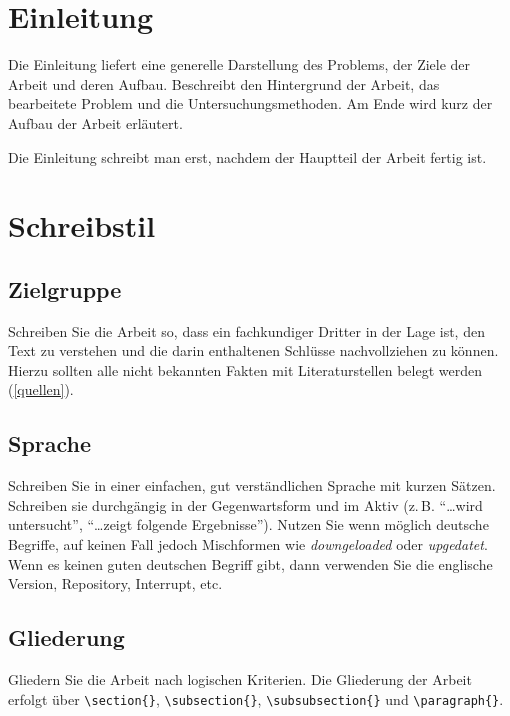 \documentclass[conference,compsoc,final,a4paper]{IEEEtran}
\begin{document}
\section{Einleitung}
Die Einleitung liefert eine generelle Darstellung des Problems, der Ziele der Arbeit und deren Aufbau. Beschreibt den Hintergrund der Arbeit, das bearbeitete Problem und die Untersuchungsmethoden. Am Ende wird kurz der Aufbau der Arbeit erläutert.

Die Einleitung schreibt man erst, nachdem der Hauptteil der Arbeit fertig ist.

\section{Schreibstil}
\subsection{Zielgruppe}
Schreiben Sie die Arbeit so, dass ein fachkundiger Dritter in der Lage ist, den Text zu verstehen und die darin enthaltenen Schlüsse nachvollziehen zu können. Hierzu sollten alle nicht bekannten Fakten mit Literaturstellen belegt werden (\autoref{quellen}).

\subsection{Sprache}
Schreiben Sie in einer einfachen, gut verständlichen Sprache mit kurzen Sätzen. Schreiben sie durchgängig in der Gegenwartsform und im Aktiv (z.\,B. \enquote{\dots wird untersucht}, \enquote{\dots zeigt folgende Ergebnisse}). Nutzen Sie wenn möglich deutsche Begriffe, auf keinen Fall jedoch Mischformen wie \emph{downgeloaded} oder \emph{upgedatet}. Wenn es keinen guten deutschen Begriff gibt, dann verwenden Sie die englische Version, \zb Repository, Interrupt, etc.

\subsection{Gliederung}
Gliedern Sie die Arbeit nach logischen Kriterien. Die Gliederung der Arbeit erfolgt über \lstinline+\section{}+, \lstinline+\subsection{}+, \lstinline+\subsubsection{}+ und \lstinline+\paragraph{}+.
\end{document}
